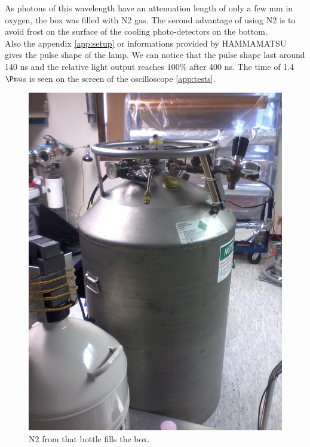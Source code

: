 \documentclass[a4paper, 11pt]{report}%
\newcommand{\xfl}{Xenon flash lamp }
\begin{document}
  As photons of this wavelength have an attenuation length of only a few mm in oxygen, the box was filled with N2 gas. 
  The second advantage of using N2 is to avoid frost on the surface of the cooling photo-detectors on the bottom.
  \\
  
  Also the appendix \ref{app:setup} or informations provided by HAMMAMATSU \cite{ref:\xfl} gives the pulse shape of the lamp. We can 
  notice that the pulse shape last around 140 ns  and the relative light output reaches $100\%$ after 400 ns. The time of 1.4 $\Pmu$s
  is seen on the screen of the oscilloscope \ref{app:tests}. 
  
  \newpage
  
  \begin{figure}[!hbtp] 
    \centering
      \includegraphics[totalheight=.35\textwidth, angle=270,trim=05cm 7.8cm 1cm 1cm, clip=true]{../Pictures/Pictures_Setup/N2_fills_box.jpg}
      \caption{N2 from that bottle fills the box.}
      \label{fig:N2_fills_box}
  \end{figure}
  
\end{document}

